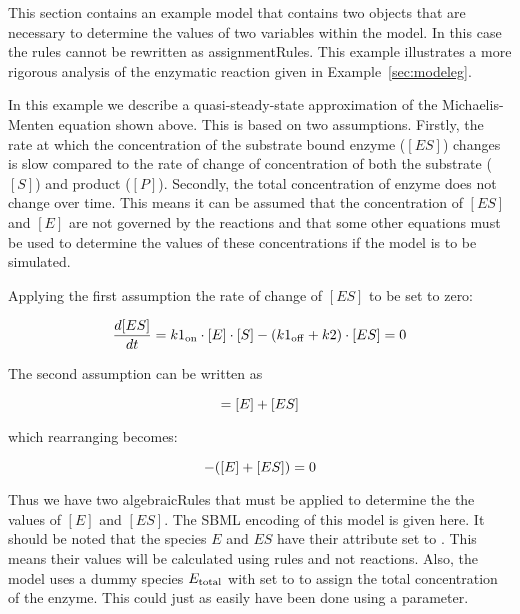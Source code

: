 This section contains an example model that contains two
\AlgebraicRule objects that are necessary to determine the 
values of two variables within the model.  In this case 
the rules cannot be rewritten as assignmentRules.  This
example illustrates a more rigorous analysis of the 
enzymatic reaction given in Example~\ref{sec:modeleg}.

\begin{center}
\end{center}

In this example we describe a quasi-steady-state 
approximation of the Michaelis-Menten equation shown above.
This is based on two assumptions.  Firstly, the rate at 
which the concentration of the substrate bound enzyme 
($[ES]$) changes is slow compared to the rate of change 
of concentration of both the substrate ($[S]$) and product 
($[P]$).  Secondly, the total concentration of enzyme does 
not change over time.  This means it can be assumed
that the concentration of $[ES]$ and $[E]$ are not governed 
by the reactions and that some other equations must be used 
to determine the values of these concentrations if the model 
is to be simulated.  

Applying the first assumption the rate of change of $[ES]$ to be set to zero:
\begin{linenomath}
\begin{equation*}
  \dfrac{d [ES]}{d t} = k1\sub{on} \cdot [E] \cdot [S] - (k1\sub{off} + k2) \cdot [ES] = 0 \\[6pt]
\end{equation*}
\end{linenomath}

The second assumption can be written as
\begin{linenomath}
\begin{equation*}
  [E\sub{total}] = [E] + [ES]\\[6pt]
\end{equation*}
\end{linenomath}
which rearranging becomes:
\begin{linenomath}
\begin{equation*}
  [E\sub{total}] - ([E] + [ES]) = 0\\[6pt]
\end{equation*}
\end{linenomath}
 

Thus we have two algebraicRules that must be applied to determine the
the values of $[E]$ and $[ES]$.  The SBML encoding of this model is given
here.  It should be noted that the species $E$ and $ES$ have their
 attribute set to .  This means their
values will be calculated using rules and not reactions.  Also, the
model uses a dummy species $E\sub{total}$ with  set to
 to assign the total concentration of the enzyme.  This could 
just as easily have been done using a parameter.

